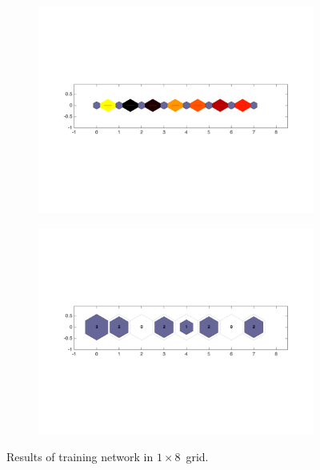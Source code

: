     \begin{figure}
        \begin{subfigure}[b]{0.5\textwidth}
            \centering
            \includegraphics[width=\textwidth]{../images/1d/apps/dist_1_by_8.png}
        \end{subfigure}
        \hfill
        \begin{subfigure}[b]{0.5\textwidth}
             \includegraphics[width=\textwidth]{../images/1d/apps/hit_t_1_by_8.png}
        \end{subfigure}
                \caption{Results of training network in $1\times8$~grid.}
         \label{fig: 1by8T}
    \end{figure}
    
